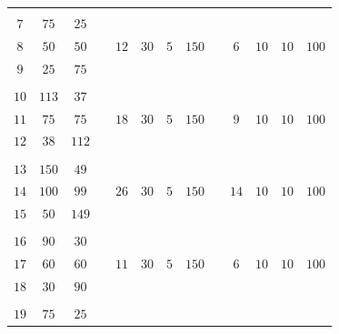 \begin{table}[!b]
{\begin{tabular}{ccclccrrlccrr}
      &   &   &  &      &      &       &       &  &      &      &      &       \\
    $7$  & $75$  & $25$  &  &      &      &       &       &  &      &      &      &       \\
    $8$  & $50$  & $50$  &  & $12$ & $30$ & \multicolumn{1}{c}{$5$  } & \multicolumn{1}{c}{$150$} &  & $6$  & $10$ & \multicolumn{1}{c}{$10$ }& \multicolumn{1}{c}{$100$} \\
    $9$  & $25$ & $75$  &  &      &      &       &       &  &      &      &      &       \\[-8pt]
      &   &   &  &      &      &       &       &  &      &      &      &       \\
    $10$ & $113$  & $37$  &  &      &      &       &       &  &      &      &      &       \\
    $11$ & $75$  & $75$ &  & $18$ & $30$ & \multicolumn{1}{c}{$5$  } & \multicolumn{1}{c}{$150$} &  & $9$  & $10$ & \multicolumn{1}{c}{$10$ }& \multicolumn{1}{c}{$100$} \\
    $12$ & $38$  & $112$ &  &      &      &       &       &  &      &      &      &       \\[-8pt]
      &   &   &  &      &      &       &       &  &      &      &      &       \\
    $13$ & $150$ & $49$  &  &      &      &       &       &  &      &      &      &       \\
    $14$ & $100$  & $99$ &  & $26$ & $30$ & \multicolumn{1}{c}{$5$  } & \multicolumn{1}{c}{$150$} &  & $14$ & $10$ & \multicolumn{1}{c}{$10$ }& \multicolumn{1}{c}{$100$} \\
    $15$ & $50$  & $149$  &  &      &      &       &       &  &      &      &      &       \\[-8pt]
      &   &   &  &      &      &       &       &  &      &      &      &       \\
    $16$ & $90$  & $30$  &  &      &      &       &       &  &      &      &      &       \\
    $17$ & $60$  & $60$  &  & $11$ & $30$ & \multicolumn{1}{c}{$5$  } & \multicolumn{1}{c}{$150$} &  & $6$  & $10$ & \multicolumn{1}{c}{$10$ }& \multicolumn{1}{c}{$100$} \\
    $18$ & $30$  & $90$  &  &      &      &       &       &  &      &      &      &       \\[-8pt]
      &   &   &  &      &      &       &       &  &      &      &      &       \\
    $19$ & $75$  & $25$  &  &      &      &       &       &  &      &      &      &       \\

\end{tabular}}
\end{table}
